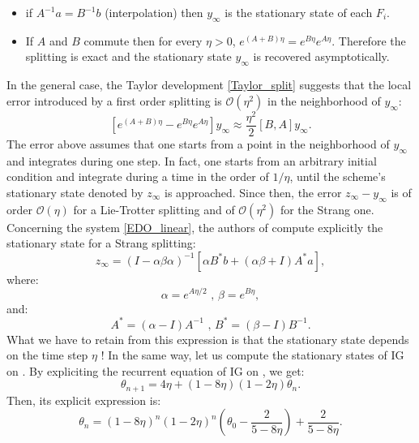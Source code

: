 \begin{itemize}
	\item if $A^{-1}a=B^{-1}b$ (interpolation) then $y_{\infty}$ is the stationary state of each $F_i$.
	\item If $A$ and $B$ commute then for every $\eta>0$, $e^{(A+B)\eta}=e^{B\eta}e^{A\eta}$. Therefore the splitting is exact and the stationary state $y_{\infty}$ is recovered asymptotically. 
\end{itemize}
In the general case, the Taylor development \eqref{Taylor_split} suggests that the local error introduced by a first order splitting is $\mathcal{O}(\eta^2)$ in the neighborhood of $y_{\infty}$:
\begin{equation*}
	\left[e^{(A+B)\eta}-e^{B\eta}e^{A\eta}\right]y_{\infty} \approx \frac{\eta^2}{2}\left[B,A\right]y_{\infty}.
\end{equation*}
The error above assumes that one starts from a point in the neighborhood of $y_{\infty}$ and integrates during one step. In fact, one starts from an arbitrary initial condition and
integrate during a time in the order of $1/\eta$, until the scheme's stationary state denoted by $z_{\infty}$ is approached. Since then, the error $z_{\infty}-y_{\infty}$ is of order $\mathcal{O}(\eta)$ for a Lie-Trotter splitting and of $\mathcal{O}(\eta^2)$ for the Strang one. Concerning the system \eqref{EDO_linear}, the authors of \cite{rebalanced_splitting} compute explicitly the stationary state for a Strang splitting:
\begin{equation*}
	z_{\infty} = (I-\alpha\beta\alpha)^{-1}\left[\alpha B^*b + (\alpha\beta+I)A^*a\right],
\end{equation*}
where:
\begin{equation*}
	\alpha = e^{A\eta/2} \text{ , } \beta = e^{B\eta},
\end{equation*}
and:
\begin{equation*}
	A^* = (\alpha-I)A^{-1} \text{ , } B^* = (\beta-I) B^{-1}.
\end{equation*}
What we have to retain from this expression is that the stationary state depends on the time step $\eta$ ! In the same way, let us compute the stationary states of IG on \exOne. By expliciting the recurrent equation of IG on \exOne, we get:
\begin{equation*}
	\theta_{n+1} = 4\eta + (1-8\eta)(1-2\eta)\theta_n.
\end{equation*} 
Then, its explicit expression is:
\begin{equation*}
	\theta_n = (1-8\eta)^n(1-2\eta)^n\left(\theta_0-\dfrac{2}{5-8\eta}\right) + \dfrac{2}{5-8\eta}.
\end{equation*}
